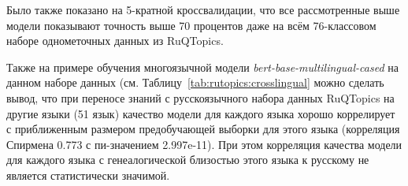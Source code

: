Было также показано на 5-кратной кроссвалидации, что все рассмотренные выше модели показывают точность выше 70 процентов даже на всём 76-классовом наборе однометочных данных из RuQTopics.

Также на примере обучения многоязычной модели \textit{bert-base-multilingual-cased} на данном наборе данных (см. Таблицу~\ref{tab:rutopics:crosslingual} можно сделать вывод, что при переносе знаний с русскоязычного набора данных RuQTopics на другие языки (51 язык) качество модели для каждого языка хорошо коррелирует с приближенным размером предобучающей выборки для этого языка (корреляция Спирмена 0.773 с пи-значением 2.997e-11). При этом корреляция качества модели для каждого языка с генеалогической близостью этого языка к русскому не является статистически значимой.
\begin{table}
\caption{Метрики модели \textit{bert-base-multilingual-cased} на объединенном тестовом наборе данных {MASSIVE} для всех языков. Модель обучалась на версии \textbf{Q} набора данных {RuQTopics}. \textbf{Код} означает код языка(ISO 639-1), \textbf{N} означает число статей в Википедии на этом языке на 11 октября 2018 года, \textbf{Дист} означает лингвистическую дистанцию между этим языком и русским. Усреднено по трем запускам.}
\label{tab:rutopics:crosslingual}
\centering
\end{table}
